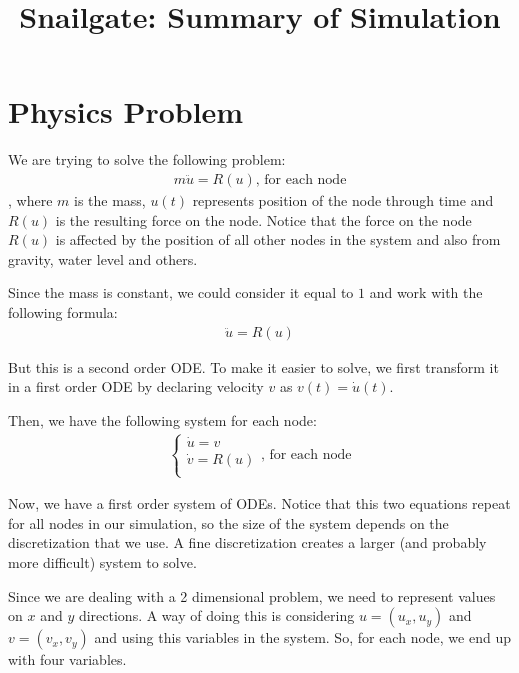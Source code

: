 \documentclass[12pt]{article}
\title{Snailgate: Summary of Simulation}
\begin{document}
\maketitle

\section{Physics Problem}
We are trying to solve the following problem:
\begin{align*}
  m \ddot{u} = R(u) \text{, for each node}
\end{align*}
, where $m$ is the mass, $u(t)$ represents position of the node through time and $R(u)$ is the resulting force on the node. Notice that the force on the node $R(u)$ is affected by the position of all other nodes in the system and also from gravity, water level and others.

Since the mass is constant, we could consider it equal to $1$ and work with the following formula:
\begin{align*}
  \ddot{u} = R(u)
\end{align*}

But this is a second order ODE. To make it easier to solve, we first transform it in a first order ODE by declaring velocity $v$ as $v(t) = \dot{u}(t)$.

Then, we have the following system for each node:
\begin{align*}
  \begin{cases}
    \dot{u} = v\\
    \dot{v} = R(u)\\
  \end{cases} \text{, for each node}
\end{align*}

Now, we have a first order system of ODEs. Notice that this two equations repeat for all nodes in our simulation, so the size of the system depends on the discretization that we use. A fine discretization creates a larger (and probably more difficult) system to solve.

Since we are dealing with a 2 dimensional problem, we need to represent values on $x$ and $y$ directions. A way of doing this is considering $u = (u_x, u_y)$ and $v = (v_x, v_y)$ and using this variables in the system. So, for each node, we end up with four variables.
\end{document}
